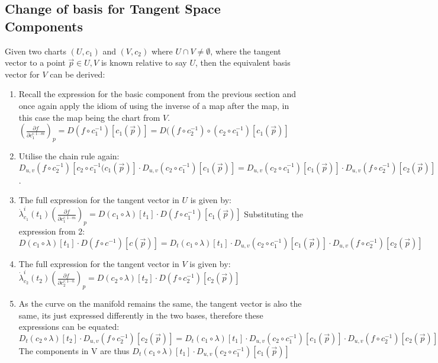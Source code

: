 \documentclass[11pt]{article}
\begin{document}
\hypertarget{change-of-basis-for-tangent-space-components}{%
\subsection{Change of basis for Tangent Space
Components}\label{change-of-basis-for-tangent-space-components}}

Given two charts \((U, c_1)\) and \((V, c_2)\) where
\(U \cap V \neq \emptyset\), where the tangent vector to a point
\(\vec{p} \in U,V\) is known relative to say \(U\), then the equivalent
basis vector for \(V\) can be derived:

\begin{enumerate}[itemsep=1pt, topsep=1pt, partopsep=0pt]
\item
  Recall the expression for the basic component from the previous
  section and once again apply the idiom of using the inverse of a map
  after the map, in this case the map being the chart from \(V\).
  \((\frac{\partial f}{\partial c_1^{i:1\cdots m}})_p = D(f \circ c_1^{-1})[c_1(\vec{p})] = D((f \circ c_2^{-1}) \circ (c_2 \circ c_1^{-1})[c_1(\vec{p})]\)
\item
  Utilise the chain rule again:
  \(D_{u,v}(f \circ c_2^{-1})[c_2 \circ c_1^{-1}(c_1(\vec{p})] \cdot D_{u,v}(c_2 \circ c_1^{-1})[c_1(\vec{p})] = D_{u,v}(c_2 \circ c_1^{-1})[c_1(\vec{p})] \cdot D_{u,v}(f \circ c_2^{-1})[c_2(\vec{p})]\).
\item
  The full expression for the tangent vector in \(U\) is given by:
  \(\dot \lambda^i_{c_1}(t_1) (\frac{\partial f}{\partial c_1^{i:1\cdots m}})_p = D(c_1 \circ \lambda)[t_1] \cdot D(f \circ c^{-1}_1)[c_1(\vec{p})]\)
  Substituting the expression from 2:
  \(D(c_1 \circ \lambda)[t_1] \cdot D(f \circ c^{-1})[c(\vec{p})] = D_t(c_1 \circ \lambda)[t_1] \cdot D_{u,v}(c_2 \circ c_1^{-1})[c_1(\vec{p})] \cdot D_{u,v}(f \circ c_2^{-1})[c_2(\vec{p})]\)
\item
  The full expression for the tangent vector in \(V\) is given by:
  \(\dot \lambda^i_{c_2}(t_2) (\frac{\partial f}{\partial c_2^{i:1\cdots n}})_p = D(c_{2} \circ \lambda)[t_2] \cdot D(f \circ c^{-1}_{2})[c_2(\vec{p})]\)
\item
  As the curve on the manifold remains the same, the tangent vector is
  also the same, its just expressed differently in the two bases,
  therefore these expressions can be equated:
  \(D_t(c_{2} \circ \lambda)[t_2] \cdot D_{u,v}(f \circ c^{-1}_{2})[c_2(\vec{p})] = D_t(c_1 \circ \lambda)[t_1] \cdot D_{u,v}(c_2 \circ c_1^{-1})[c_1(\vec{p})] \cdot D_{u,v}(f \circ c_2^{-1})[c_2(\vec{p})]\)
  The components in V are thus
  \(D_t(c_1 \circ \lambda)[t_1] \cdot D_{u,v}(c_2 \circ c_1^{-1})[c_1(\vec{p})]\)
\end{enumerate}
\end{document}
